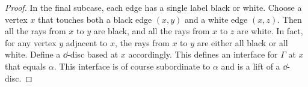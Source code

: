 \begin{proof}
In the final subcase, each edge has a single label black or white.  Choose a vertex $x$ that touches both a black edge $(x,y)$ and a white edge $(x,z)$.  Then all the rays from $x$ to $y$ are black, and all the rays from $x$ to $z$ are white.  In fact, for any vertex $y$ adjacent to $x$, the rays from $x$ to $y$ are either all black or all white.  Define a $\dd$-disc based at $x$ accordingly.  This defines an interface for $\Gamma$ at $x$ that equals $\alpha$.  This interface is of course subordinate to $\alpha$ and is a lift of a $\dd$-disc.  
\end{proof}
